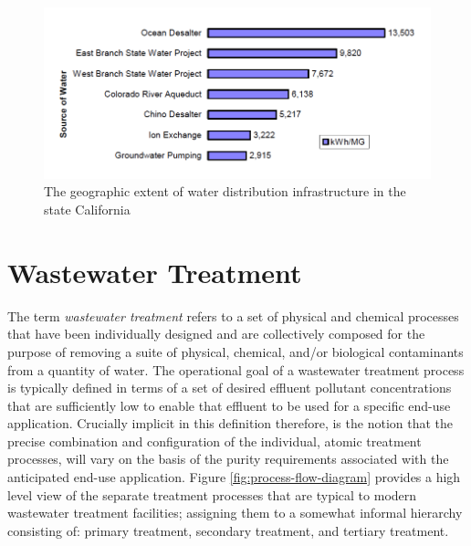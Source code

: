      \begin{figure}[!h]
       \centering
       \includegraphics[width=5.5in]{figures/energy-intensity.png}
       \caption[Energy Intensity of Water Distribution Infrastructure]{The geographic extent of water distribution infrastructure in the state California \cite{Klein2005}}
       \label{fig:infrastructure-energy-intensity}
     \end{figure}
     
\section{Wastewater Treatment}

The term \textit{wastewater treatment} refers to a set of physical and chemical processes that have been individually designed and are collectively composed for the purpose of removing a suite of physical, chemical, and/or biological contaminants from a quantity of water. The operational goal of a wastewater treatment process is typically defined in terms of a set of desired effluent pollutant concentrations that are sufficiently low to enable that effluent to be used for a specific end-use application. Crucially implicit in this definition therefore, is the notion that the precise combination and configuration of the individual, atomic treatment processes, will vary on the basis of the purity requirements associated with the anticipated end-use application. Figure \ref{fig:process-flow-diagram} provides a high level view of the separate treatment processes that are typical to modern wastewater treatment facilities; assigning them to a somewhat informal hierarchy consisting of: primary treatment, secondary treatment, and tertiary treatment.

